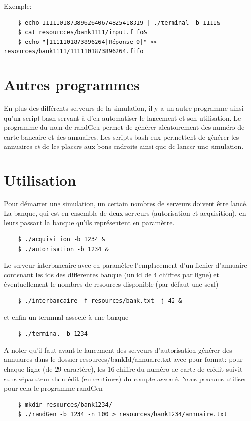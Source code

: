 \documentclass[french, a4paper, 12pt, titlepage]{article}
\begin{document}
Exemple: \vspace{-0.9em}
\begin{verbatim}
	$ echo 11111018738962640674825418319 | ./terminal -b 1111&
	$ cat resourcces/bank1111/input.fifo&
	$ echo "|1111101873896264|Réponse|0|" >> resources/bank1111/1111101873896264.fifo
\end{verbatim}

\section{Autres programmes}
En plus des différents serveurs de la simulation, il y a un autre programme ainsi qu'un script bash servant à d'en automatiser le lancement et son utilisation.
Le programme du nom de \og randGen\fg{} permet de générer aléatoirement des numéro de carte bancaire et des annuaires.
Les scripts bash eux permettent de générer les annuaires et de les placers aux bons endroits ainsi que de lancer une simulation.

\section{Utilisation}
Pour démarrer une simulation, un certain nombres de serveurs doivent être lancé.
La banque, qui est en ensemble de deux serveurs (autorisation et acquisition), en leurs passant la banque qu'ils représentent en paramètre.
\begin{verbatim}
	$ ./acquisition -b 1234 &
	$ ./autorisation -b 1234 &
\end{verbatim}

Le serveur interbancaire avec en paramètre l'emplacement d'un fichier d'annuaire contenant les ids des differentes banque (un id de 4 chiffres par ligne) et éventuellement le nombres de resources disponible (par défaut une seul)
\begin{verbatim}
	$ ./interbancaire -f resources/bank.txt -j 42 &
\end{verbatim}

et enfin un terminal associé à une banque
\begin{verbatim}
	$ ./terminal -b 1234
\end{verbatim}

A noter qu'il faut avant le lancement des serveurs d'autorisation générer des annuaires dans le dossier resources/bankId/annuaire.txt avec pour format:
pour chaque ligne (de 29 caractère), les 16 chiffre du numéro de carte de crédit suivit sans séparateur du crédit (en centimes) du compte associé.
Nous pouvons utiliser pour cela le programme \og randGen\fg{}
\begin{verbatim}
	$ mkdir resources/bank1234/
	$ ./randGen -b 1234 -n 100 > resources/bank1234/annuaire.txt
\end{verbatim}
\end{document}
